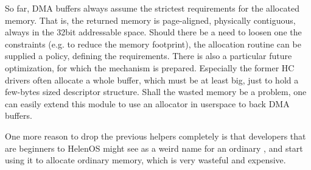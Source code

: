 So far, DMA buffers always assume the strictest requirements for the allocated
memory. That is, the returned memory is page-aligned, physically contiguous,
always in the 32bit addressable space. Should there be a need to loosen one the
constraints (e.g. to reduce the memory footprint), the allocation routine can
be supplied a policy, defining the requirements. There is also a particular
future optimization, for which the mechanism is prepared. Especially the former
HC drivers often allocate a whole buffer, which must be at least
 big, just to hold a few-bytes sized descriptor structure.
Shall the wasted memory be a problem, one can easily extend this module to use
an allocator in userspace to back DMA buffers.

One more reason to drop the previous  helpers completely is that
developers that are beginners to HelenOS might see  as a weird
name for an ordinary , and start using it to allocate ordinary
memory, which is very wasteful and expensive.
